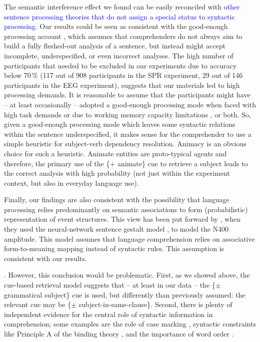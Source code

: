 \documentclass[review,preprint,12pt,authoryear,floatsintext]{elsarticle}
\begin{document}
{{{The semantic interference effect we found can be easily reconciled with \textcolor{blue}{other sentence processing theories that do not assign a special status to syntactic processing}. Our results could be seen as consistent with the good-enough processing account \citep{ferreira2007goodenough}, which assumes that comprehenders do not always aim to build a fully fleshed-out analysis of a sentence, but instead might accept incomplete, underspecified, or even incorrect analyses. The high number of participants that needed to be excluded in our experiments due to accuracy below 70\,\% (117 out of 908 participants in the SPR experiment, 29 out of 146 participants in the EEG experiment), suggests that our materials led to high processing demands. It is reasonable to assume that the participants might have -- at least occasionally -- adopted a good-enough processing mode when faced with high task demands \citep{swets2008underspecification,LogacevMultiple,LogacevVasishthQJEP2016} or due to working memory capacity limitations \citep{MalsburgVasishth2013}, or both. So, given a good-enough processing mode which leaves some syntactic relations within the sentence underspecified, it makes sense for the comprehender to use a simple heuristic for subject-verb dependency resolution. Animacy is an obvious choice for such a heuristic. Animate entities are proto-typical agents \citep{dowty1991thematic} and therefore, the primary use of the \{+ animate\} cue to retrieve a subject leads to the correct analysis with high probability (not just within the experiment context, but also in everyday language use). 
 
Finally, our findings are also consistent with the possibility that language processing relies predominantly on semantic associations to form (probabilistic)
representation of event structures. This view has been put forward by \cite{rabovsky_etal_2018}, when they used the neural-network sentence gestalt model \citep{mcclelland1989_sentence_gestalt}, to model the N400 amplitude. This model assumes that language comprehension relies on associative form-to-meaning mapping instead of syntactic rules. This assumption is consistent with our results.}

\label{thisdesign2}. However, this conclusion would be problematic. First, as we showed above, the cue-based retrieval model suggests that -- at least in our data -- the \{$\pm$ grammatical subject\} cue is used, but differently than previously assumed: the relevant cue may be \{$\pm$ subject-in-same-clause\}. Second, there is plenty of independent evidence for the central role of syntactic information in comprehension; some examples are the role of case marking \citep[e.g.,][]{Avetisyan_etal_2020_agree,HusainEtAl2014,bhatia2022processing,bader2000case,bader2006case,miyamoto2002case}, syntactic constraints like Principle A of the binding theory \citep[e.g.,][]{Sturt2003,dillon2013,yadav2021individual},  and 
the importance of word order \citep[e.g.,][]{meng2000mode}. 

}}
\end{document}
